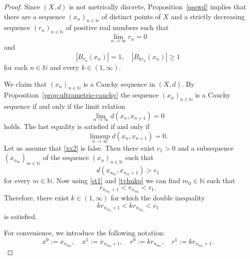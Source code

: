\documentclass[11pt]{article}
\theoremstyle{definition}
\theoremstyle{remark}
\numberwithin{equation}{section}
\begin{document}
\begin{proof}
Since $(X,d)$ is not metrically discrete, Proposition~\ref{qsswd} implies that there are a sequence $(x_n)_{n\in\mathbb{N}}$ of distinct points of $X$ 
    and a strictly decreasing sequence $(r_n)_{n\in\mathbb{N}}$ of  positive real numbers 
    such that 
    \begin{equation}\label{st1}
    \lim\limits_{n\to\infty}r_n=0
        \end{equation}
    and
\begin{equation}
    \label{st2}
\left|B_{r_n}(x_n)\right|=1,\quad \left|B_{kr_n}(x_n)\right|\geq 1
    \end{equation}
    for each $n\in {\mathbb N}$ and every $k\in (1,\infty).$



We claim that $(x_n)_{n\in\mathbb{N}}$ is a Cauchy sequence in $(X,d)$.  
By Proposition~\ref{prop:ultrametric-cauchy} the sequence $(x_n)_{n\in\mathbb{N}}$ is a Cauchy sequence if and only if the limit relation
\begin{equation*}
\lim_{n\to\infty} d(x_n,x_{n+1})=0
\end{equation*}
holds.
The last equality is satisfied if and only if
\begin{equation}\label{xx2}
    \limsup_{n\to\infty} d(x_n, x_{n+1}) = 0.
\end{equation}
Let us assume that \eqref{xx2} is false.  
Then there exist $c_1>0$ and a subsequence $(x_{n_m})_{m\in\mathbb{N}}$ of the sequence $(x_n)_{n\in\mathbb{N}}$ such that
\begin{equation}
    \label{tvhukp}
      d(x_{n_m}, x_{n_m+1}) > c_1
\end{equation}
for every $m\in \mathbb N$.
Now using \eqref{st1} and \eqref{tvhukp} we can find $m_0\in \mathbb N$ such that 
\begin{equation}\label{cc1}
    r_{n_{m_0}+1}< r_{n_{m_0}}<c_1.
\end{equation}
Therefore, there exist $k\in (1,\infty)$ for which the double inequality
\begin{equation}
    \label{cc2}
kr_{n_{m_0}+1}<kr_{n_{m_0}}<c_1
\end{equation}
is satisfied.

For convenience, we introduce the following notation:
\begin{equation}
    \label{cc3}
    x^0 := x_{n_{m_0}}, \quad x^1 := x_{n_{m_0}+1}, \quad
    r^0 := kr_{n_{m_0}}, \quad r^1 := kr_{n_{m_0}+1}.
\end{equation}


\end{proof}
\end{document}
